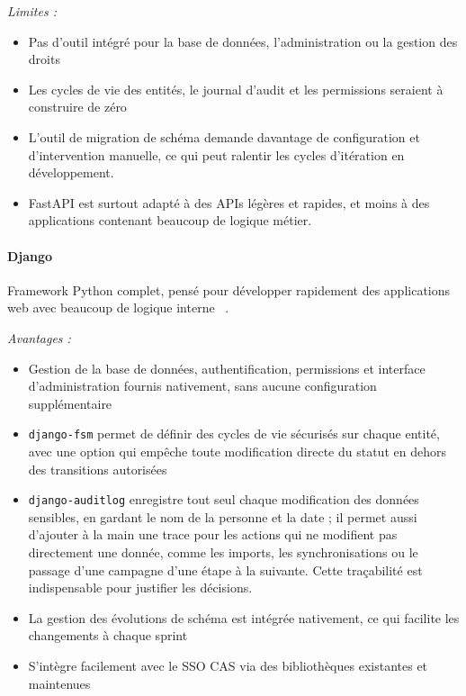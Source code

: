 \textit{Limites :}
\begin{itemize}
  \item Pas d'outil intégré pour la base de données,
        l'administration ou la gestion des droits
  \item Les cycles de vie des entités,
        le journal d'audit et les permissions
        seraient à construire de zéro
  \item L'outil de migration de schéma demande davantage de configuration et d'intervention manuelle, ce qui peut ralentir les cycles d'itération en développement.
  \item FastAPI est surtout adapté à des APIs légères et rapides, et moins à des applications contenant beaucoup de logique métier.
\end{itemize}

\paragraph{Django}
Framework Python complet, pensé pour développer
rapidement des applications web avec beaucoup
de logique interne ~\cite{django_dev}.

\textit{Avantages :}
\begin{itemize}
  \item Gestion de la base de données,
        authentification, permissions et interface
        d'administration fournis nativement,
        sans aucune configuration supplémentaire
  \item \texttt{django-fsm} permet de définir
        des cycles de vie sécurisés sur chaque entité,
        avec une option qui empêche toute
        modification directe du statut
        en dehors des transitions autorisées
  \item \texttt{django-auditlog} enregistre tout seul chaque
        modification des données sensibles, en gardant le nom
        de la personne et la date ; il permet aussi d'ajouter
        à la main une trace pour les actions qui ne modifient
        pas directement une donnée, comme les imports, les
        synchronisations ou le passage d'une campagne d'une
        étape à la suivante. Cette traçabilité est indispensable
        pour justifier les décisions.
  \item La gestion des évolutions de schéma
        est intégrée nativement, ce qui
        facilite les changements à chaque sprint
  \item S'intègre facilement avec le SSO CAS
        via des bibliothèques existantes et maintenues
\end{itemize}

